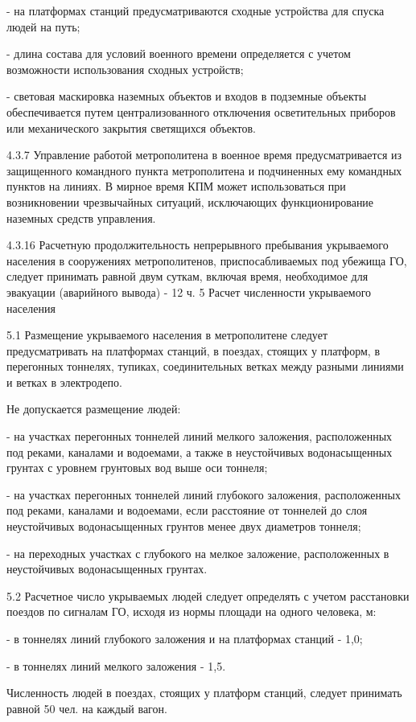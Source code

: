 \begin{itemize}
- на платформах станций предусматриваются сходные устройства для спуска людей
на путь;

- длина состава для условий военного времени определяется с учетом возможности
использования сходных устройств;

- световая маскировка наземных объектов и входов в подземные объекты
обеспечивается путем централизованного отключения осветительных приборов или
механического закрытия светящихся объектов.

4.3.7 Управление работой метрополитена в военное время предусматривается из
защищенного командного пункта метрополитена и подчиненных ему командных пунктов
на линиях. В мирное время КПМ может использоваться при возникновении
чрезвычайных ситуаций, исключающих функционирование наземных средств
управления.

4.3.16 Расчетную продолжительность непрерывного пребывания укрываемого
населения в сооружениях метрополитенов, приспосабливаемых под убежища ГО,
следует принимать равной двум суткам, включая время, необходимое для эвакуации
(аварийного вывода) - 12 ч. 5 Расчет численности укрываемого населения

5.1 Размещение укрываемого населения в метрополитене следует предусматривать на
платформах станций, в поездах, стоящих у платформ, в перегонных тоннелях,
тупиках, соединительных ветках между разными линиями и ветках в электродепо.

Не допускается размещение людей:

- на участках перегонных тоннелей линий мелкого заложения, расположенных под
реками, каналами и водоемами, а также в неустойчивых водонасыщенных грунтах с
уровнем грунтовых вод выше оси тоннеля;

- на участках перегонных тоннелей линий глубокого заложения, расположенных под
реками, каналами и водоемами, если расстояние от тоннелей до слоя неустойчивых
водонасыщенных грунтов менее двух диаметров тоннеля;

- на переходных участках с глубокого на мелкое заложение, расположенных в
неустойчивых водонасыщенных грунтах.

5.2 Расчетное число укрываемых людей следует определять с учетом расстановки
поездов по сигналам ГО, исходя из нормы площади на одного человека, м:

- в тоннелях линий глубокого заложения и на платформах станций - 1,0;

- в тоннелях линий мелкого заложения - 1,5.

Численность людей в поездах, стоящих у платформ станций, следует принимать
равной 50 чел. на каждый вагон.


\end{itemize}
